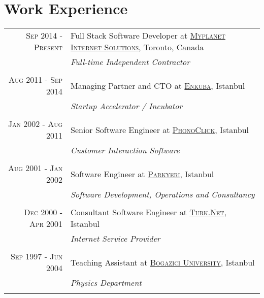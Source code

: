 \documentclass[a4paper,10pt]{article}
\begin{document}
\section{Work Experience}
\begin{tabular}{r|p{11cm}}
  \textsc{Sep 2014 - Present}   & Full Stack Software Developer at \href{https://www.myplanet.com}{\textsc{Myplanet Internet Solutions}}, Toronto, Canada \\
                                & \emph{Full-time Independent Contractor} \\

  \multicolumn{2}{c}{} \\

  \textsc{Aug 2011 - Sep 2014}  & Managing Partner and CTO at \href{http://www.enkuba.com}{\textsc{Enkuba}}, Istanbul \\
                                & \emph{Startup Accelerator / Incubator} \\

  \multicolumn{2}{c}{} \\

  \textsc{Jan 2002 - Aug 2011}  & Senior Software Engineer at \href{http://www.phonoclick.com}{\textsc{PhonoClick}}, Istanbul \\
                                & \emph{Customer Interaction Software}  \\

  \multicolumn{2}{c}{} \\

  \textsc{Aug 2001 - Jan 2002}  & Software Engineer at \href{http://www.parkyeri.com}{\textsc{Parkyeri}}, Istanbul \\
                                & \emph{Software Development, Operations and Consultancy} \\

  \multicolumn{2}{c}{} \\

  \textsc{Dec 2000 - Apr 2001}  & Consultant Software Engineer at \href{http://turk.net/}{\textsc{Turk.Net}}, Istanbul \\
                                & \emph{Internet Service Provider} \\

  \multicolumn{2}{c}{} \\

  \textsc{Sep 1997 - Jun 2004}  & Teaching Assistant at \href{http://www.boun.edu.tr/}{\textsc{Bogazici University}}, Istanbul \\
                                & \emph{Physics Department} \\

  \multicolumn{2}{c}{} \\

\end{tabular}
\end{document}
